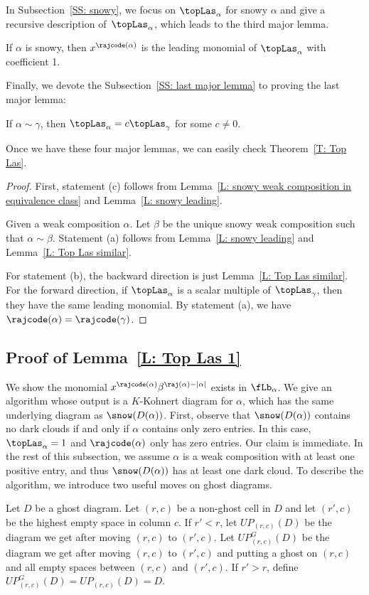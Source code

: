 In Subsection~\ref{SS: snowy}, 
we focus on $\topLas_\alpha$ for snowy $\alpha$ and give a recursive description of~$\topLas_\alpha$,
which leads to the third major lemma.

\begin{lemma}
\label{L: snowy leading}
If $\alpha$ is snowy, 
then $x^{\rajcode(\alpha)}$ is the leading monomial of 
$\topLas_\alpha$ with coefficient 1.
\end{lemma}
Finally, we devote the Subsection~\ref{SS: last major lemma} to proving the last
major lemma:

\begin{lemma}
\label{L: Top Las similar}
If $\alpha \sim \gamma$, 
then $\topLas_\alpha = c\topLas_\gamma$ for some $c \neq 0$.
\end{lemma}

Once we have these four major lemmas, 
we can easily check Theorem~\ref{T: Top Las}.


\begin{proof}
First, statement (c) follows from Lemma~\ref{L: snowy weak composition in equivalence class} and Lemma~\ref{L: snowy leading}. 

Given a weak composition $\alpha$. Let $\beta$ be the unique snowy weak composition such that $\alpha \sim \beta$. Statement (a) follows from  Lemma~\ref{L: snowy leading} and Lemma~\ref{L: Top Las similar}.

For statement (b), the backward direction is just Lemma~\ref{L: Top Las similar}.
For the forward direction, 
if $\topLas_\alpha$ is a scalar multiple of $\topLas_\gamma$,
then they have the same leading monomial.
By statement (a), we have $\rajcode(\alpha) = \rajcode(\gamma)$.
\end{proof}


\subsection{Proof of Lemma~\ref{L: Top Las 1}}
\label{SS: Top Las: Exist}

We show the monomial $ x^{\rajcode(\alpha)}\beta^{\raj(\alpha) - |\alpha|}$ 
exists in $\fLb_\alpha$.
We give an algorithm whose output is a $K$-Kohnert diagram for $\alpha$, which has the same underlying diagram as $\snow(D(\alpha))$. First, observe that $\snow(D(\alpha))$ contains no dark clouds if and only if $\alpha$ contains only zero entries. In this case, $\topLas_\alpha = 1$ and $\rajcode(\alpha)$ only has zero entries. Our claim is immediate. 
In the rest of this subsection, we assume $\alpha$ is a weak composition
with at least one positive entry, and thus $\snow(D(\alpha))$ has at least one dark cloud.
To describe the algorithm, 
we introduce two useful moves on ghost diagrams.
\begin{defn}
Let $D$ be a ghost diagram.
Let $(r,c)$ be a non-ghost cell in $D$
and let $(r', c)$ be the highest empty space in column $c$.
If $r' < r$,
let $UP_{(r,c)}(D)$ be the diagram we get after 
moving $(r,c)$ to $(r',c)$. 
Let $UP^G_{(r,c)}(D)$ be the diagram we get after 
moving $(r,c)$ to $(r',c)$
and putting a ghost on $(r,c)$ and all empty spaces between $(r,c)$ and $(r',c)$.
If $r' > r$, define 
$UP^G_{(r,c)}(D) = UP_{(r,c)}(D) = D$.
\end{defn}

